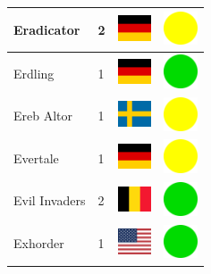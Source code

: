 \documentclass[12pt, a4paper, twoside]{report}
\begin{document}
\begin{center}
\begin{longtable}{|p{5cm}|p{2cm}|p{2cm}|p{2cm}|}
			Eradicator & 2 & \includegraphics[width=1cm]{4x3/de} & \includegraphics[width=1cm]{likes/m} \\ \hline
			Erdling & 1 & \includegraphics[width=1cm]{4x3/de} & \includegraphics[width=1cm]{likes/y} \\ \hline
			Ereb Altor & 1 & \includegraphics[width=1cm]{4x3/se} & \includegraphics[width=1cm]{likes/m} \\ \hline
			Evertale & 1 & \includegraphics[width=1cm]{4x3/de} & \includegraphics[width=1cm]{likes/m} \\ \hline
			Evil Invaders & 2 & \includegraphics[width=1cm]{4x3/be} & \includegraphics[width=1cm]{likes/y} \\ \hline
			Exhorder & 1 & \includegraphics[width=1cm]{4x3/us} & \includegraphics[width=1cm]{likes/y} \\ \hline

\end{longtable}
\end{center}
\end{document}
